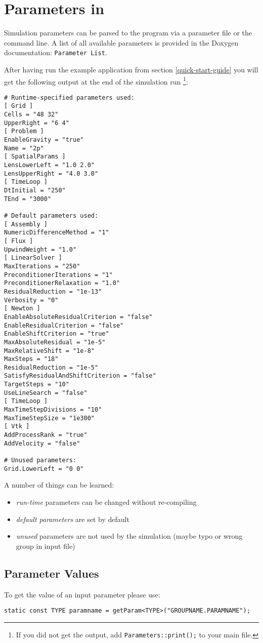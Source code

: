 \section{Parameters in \Dumux}
\label{sc_parameterfiles}
Simulation parameters can be parsed to the program via a parameter file or the command line.
A list of all available parameters is provided in the Doxygen documentation: \texttt{Parameter List}.

After having run the example application from section \ref{quick-start-guide} you will
get the following output at the end of the simulation run
\footnote{If you did not get the output, add \texttt{Parameters::print();} to your main file.}:
\begin{lstlisting}[style=Bash]
# Runtime-specified parameters used:
[ Grid ]
Cells = "48 32"
UpperRight = "6 4"
[ Problem ]
EnableGravity = "true"
Name = "2p"
[ SpatialParams ]
LensLowerLeft = "1.0 2.0"
LensUpperRight = "4.0 3.0"
[ TimeLoop ]
DtInitial = "250"
TEnd = "3000"

# Default parameters used:
[ Assembly ]
NumericDifferenceMethod = "1"
[ Flux ]
UpwindWeight = "1.0"
[ LinearSolver ]
MaxIterations = "250"
PreconditionerIterations = "1"
PreconditionerRelaxation = "1.0"
ResidualReduction = "1e-13"
Verbosity = "0"
[ Newton ]
EnableAbsoluteResidualCriterion = "false"
EnableResidualCriterion = "false"
EnableShiftCriterion = "true"
MaxAbsoluteResidual = "1e-5"
MaxRelativeShift = "1e-8"
MaxSteps = "18"
ResidualReduction = "1e-5"
SatisfyResidualAndShiftCriterion = "false"
TargetSteps = "10"
UseLineSearch = "false"
[ TimeLoop ]
MaxTimeStepDivisions = "10"
MaxTimeStepSize = "1e300"
[ Vtk ]
AddProcessRank = "true"
AddVelocity = "false"

# Unused parameters:
Grid.LowerLeft = "0 0"
\end{lstlisting}

A number of things can be learned:
\begin{itemize}
  \item \emph{run-time} parameters can be changed without re-compiling
  \item \emph{default parameters} are set by default
  \item \emph{unused} parameters are not used by the simulation (maybe typo or wrong group in input file)
\end{itemize}


\subsection{Parameter Values}
To get the value of an input parameter please use:
\begin{lstlisting}[name=propsyscars,style=DumuxCode]
static const TYPE paramname = getParam<TYPE>("GROUPNAME.PARAMNAME");
\end{lstlisting}

